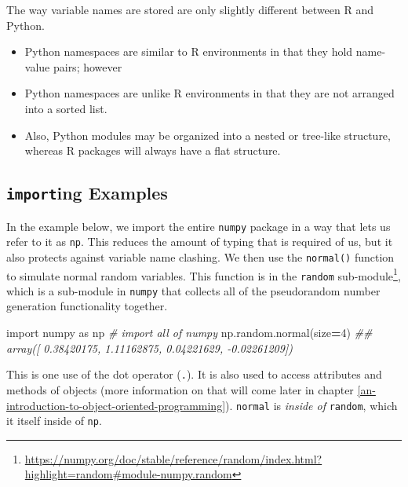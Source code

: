 \documentclass[12pt,krantz2]{krantz}
\makeatletter
\newenvironment{Shaded}{\begin{snugshade}}{\end{snugshade}}
\newcommand{\CommentTok}[1]{\textcolor[rgb]{0.37,0.37,0.37}{\textit{#1}}}
\newcommand{\DecValTok}[1]{\textcolor[rgb]{0.06,0.06,0.06}{#1}}
\newcommand{\ImportTok}[1]{#1}
\newcommand{\NormalTok}[1]{#1}
\newcommand{\OperatorTok}[1]{\textcolor[rgb]{0.43,0.43,0.43}{\textbf{#1}}}
\providecommand{\tightlist}{%
  \setlength{\itemsep}{0pt}\setlength{\parskip}{0pt}}
\renewcommand{\href}[2]{#2\footnote{\url{#1}}}
\newenvironment{kframe}{%
\medskip{}
\setlength{\fboxsep}{.8em}
 \def\at@end@of@kframe{}%
 \ifinner\ifhmode%
  \def\at@end@of@kframe{\end{minipage}}%
  \begin{minipage}{\columnwidth}%
 \fi\fi%
 \def\FrameCommand##1{\hskip\@totalleftmargin \hskip-\fboxsep
 \colorbox{shadecolor}{##1}\hskip-\fboxsep
     \hskip-\linewidth \hskip-\@totalleftmargin \hskip\columnwidth}%
 \MakeFramed {\advance\hsize-\width
   \@totalleftmargin\z@ \linewidth\hsize
   \@setminipage}}%
 {\par\unskip\endMakeFramed%
 \at@end@of@kframe}
\renewenvironment{Shaded}{\begin{kframe}}{\end{kframe}}
\makeatother
\begin{document}
\begin{rmd-details}
The way variable names are stored are only slightly different between R and Python.

\begin{itemize}
\tightlist
\item
  Python namespaces are similar to R environments in that they hold name-value pairs; however
\item
  Python namespaces are unlike R environments in that they are not arranged into a sorted list.
\item
  Also, Python modules may be organized into a nested or tree-like structure, whereas R packages will always have a flat structure.
\end{itemize}


\end{rmd-details}

\hypertarget{importing-examples}{%
\subsection{\texorpdfstring{\texttt{import}ing Examples}{importing Examples}}\label{importing-examples}}

In the example below, we import the entire \texttt{numpy} package in a way that lets us refer to it as \texttt{np}. This reduces the amount of typing that is required of us, but it also protects against variable name clashing. We then use the \texttt{normal()} function to simulate normal random variables. This function is in the \href{https://numpy.org/doc/stable/reference/random/index.html?highlight=random\#module-numpy.random}{\texttt{random} sub-module}, which is a sub-module in \texttt{numpy} that collects all of the pseudorandom number generation functionality together.

\begin{Shaded}
\begin{Highlighting}[]
\ImportTok{import}\NormalTok{ numpy }\ImportTok{as}\NormalTok{ np }\CommentTok{# import all of numpy}
\NormalTok{np.random.normal(size}\OperatorTok{=}\DecValTok{4}\NormalTok{)}
\CommentTok{## array([ 0.38420175,  1.11162875,  0.04221629, -0.02261209])}
\end{Highlighting}
\end{Shaded}

This is one use of the dot operator (\texttt{.}). It is also used to access attributes and methods of objects (more information on that will come later in chapter \ref{an-introduction-to-object-oriented-programming}). \texttt{normal} is \emph{inside of} \texttt{random}, which it itself inside of \texttt{np}.
\end{document}

